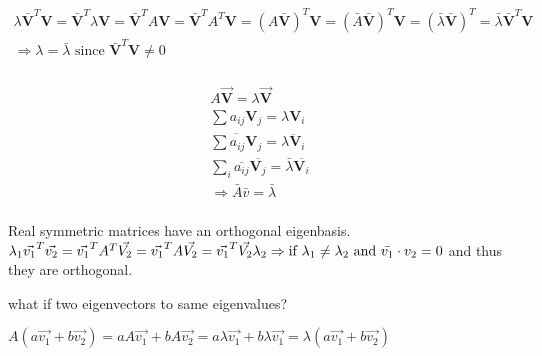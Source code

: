     \begin{equation*}
      \begin{array}{l}
        \lambda \bar{\mathbf{V}}^T \mathbf{V} = \bar{\mathbf{V}}^T \lambda \mathbf{V} = \bar{\mathbf{V}}^T A\mathbf{V} = \bar{\mathbf{V}}^T A^T \mathbf{V} = (A\bar{\mathbf{V}})^T \mathbf{V} = (\bar{A}\bar{\mathbf{V}})^T \mathbf{V} = (\bar{\lambda}\bar{\mathbf{V}})^T = \bar{\lambda}\bar{\mathbf{V}}^T \mathbf{V}\\
        \Rightarrow \lambda = \bar{\lambda} \text{ since } \bar{\mathbf{V}}^T \mathbf{V} \neq 0\\
      \end{array}
    \end{equation*}
    
    
    \vspace{10px}
    
    \begin{equation*}
      \begin{array}{l}
        A\Vec{\mathbf{V}}=\lambda\Vec{\mathbf{V}}\\
        \sum a_{ij}\mathbf{V}_{j} = \lambda \mathbf{V}_{i}\\
        \overline{\sum a_{ij}\mathbf{V}_{j}} = \overline{\lambda\mathbf{V}_{i}}\\
        \sum_{i}\overline{a_{ij}}\overline{\mathbf{V}_{j}}=\bar{\lambda}\overline{\mathbf{V}_{i}}\\
        \Rightarrow \bar{A}\bar{v} = \bar{\lambda}\\
      \end{array}
    \end{equation*}
    
    \vspace{10px}
    
    Real symmetric matrices have an orthogonal eigenbasis. \\
    
    $\lambda_{1} \Vec{v_{1}}^T \Vec{v_{2}} = \Vec{v_{1}}^T A^T \Vec{V_{2}} = \Vec{v_{1}}^T A \Vec{V_{2}} = \Vec{v_{1}}^T \Vec{V_{2}} \lambda_{2}\\
    \Rightarrow \text{if } \lambda_{1} \neq \lambda_{2} \text{ and } \bar{v_{1}} \cdot v_{2} =0$ 
    and thus they are orthogonal.\\
    \vspace{10px}
    
    what if two eigenvectors to same eigenvalues?\\
    \begin{center}
        $A(a\Vec{v_{1}}+b\Vec{v_{2}})=aA\Vec{v_{1}}+bA\Vec{v_{2}}=a\lambda\Vec{v_{1}}+b\lambda\Vec{v_{1}}=\lambda(a\Vec{v_{1}}+b\Vec{v_{2}})$
    \end{center}
    
